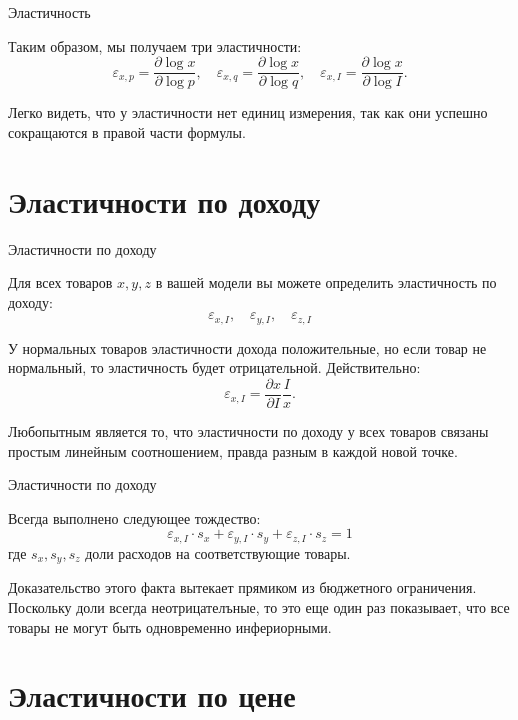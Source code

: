 \documentclass{beamer}
\begin{document}
\begin{frame}{Эластичность}

Таким образом, мы получаем три эластичности:
$$\varepsilon_{x,p} = \frac{\partial \log x}{\partial \log p}, \quad \varepsilon_{x,q} = \frac{\partial \log x}{\partial \log q}, \quad \varepsilon_{x,I} = \frac{\partial \log x}{\partial \log I}.$$

Легко видеть, что у эластичности нет единиц измерения, так как они успешно сокращаются в правой части формулы. 

\end{frame}

\section{Эластичности по доходу}

\begin{frame}{Эластичности по доходу}

Для всех товаров $x,y,z$ в вашей модели вы можете определить эластичность по доходу:
$$\varepsilon_{x,I}, \quad \varepsilon_{y,I}, \quad \varepsilon_{z,I}$$

У нормальных товаров эластичности дохода положительные, но если товар не нормальный, то эластичность будет отрицательной. Действительно:
$$\varepsilon_{x,I} = \frac{\partial x}{\partial I} \frac{I}{x}.$$

Любопытным является то, что эластичности по доходу у всех товаров связаны простым линейным соотношением, правда разным в каждой новой точке.

\end{frame}

\begin{frame}{Эластичности по доходу}

\begin{lemma}
Всегда выполнено следующее тождество:
$$\varepsilon_{x,I} \cdot s_x + \varepsilon_{y,I} \cdot s_y + \varepsilon_{z,I} \cdot s_z = 1$$
где $s_x, s_y, s_z$ доли расходов на соответствующие товары.
\end{lemma}

Доказательство этого факта вытекает прямиком из бюджетного ограничения. Поскольку доли всегда неотрицателъные, то это еще один раз показывает, что все товары не могут быть одновременно инфериорными.

\end{frame}

\section{Эластичности по цене}
\end{document}
